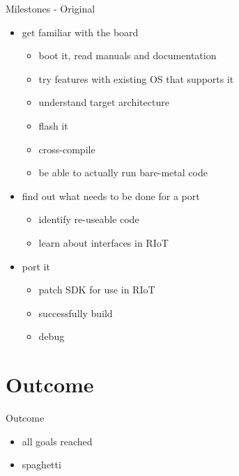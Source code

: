 \documentclass[9pt]{beamer}
\begin{document}
\begin{frame}{Milestones - Original}
 \begin{itemize}
 \item get familiar with the board
 	\begin{itemize}
 	\item boot it, read manuals and documentation
 	\item try features with existing OS that supports it
 	\item understand target architecture
 	\item flash it
 	\item cross-compile
 	\item be able to actually run bare-metal code
 	\end{itemize}
 \item find out what needs to be done for a port
 	\begin{itemize}
 	\item identify re-useable code
 	\item learn about interfaces in RIoT
 	\end{itemize}
 \item port it
 	\begin{itemize}
 	\item patch SDK for use in RIoT
 	\item successfully build
 	\item debug
 	\end{itemize}
 \end{itemize}
\end{frame}


\section{Outcome}

\begin{frame}{Outcome}
 \begin{itemize}
  \item all goals reached
 	\item spaghetti
 \end{itemize}
\end{frame}
\end{document}
